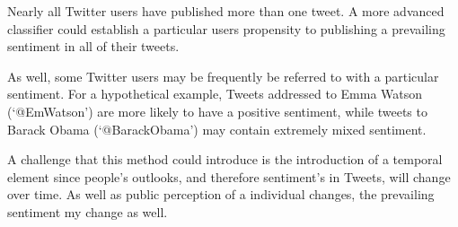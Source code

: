 \documentclass[12pt]{article}
\begin{document}
Nearly all Twitter users have published more than one tweet. A more advanced
classifier could establish a particular users propensity to publishing a
prevailing sentiment in all of their tweets.

As well, some Twitter users may be frequently be referred to with a particular
sentiment. For a hypothetical example, Tweets addressed to Emma Watson
(`@EmWatson') are more likely to have a positive sentiment, while tweets to
Barack Obama (`@BarackObama') may contain extremely mixed sentiment.

A challenge that this method could introduce is the introduction of a temporal
element since people's outlooks, and therefore sentiment's in Tweets, will
change over time. As well as public perception of a individual changes, the
prevailing sentiment my change as well.


\nocite{*}


\end{document}
